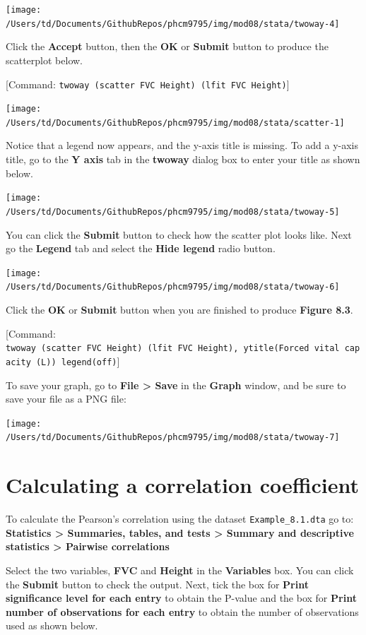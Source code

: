 \documentclass[
]{memoir}
\begin{document}
\texttt{[image: /Users/td/Documents/GithubRepos/phcm9795/img/mod08/stata/twoway-4]}

Click the \textbf{Accept} button, then the \textbf{OK} or \textbf{Submit} button to produce the scatterplot below.

{[}Command: \texttt{twoway\ (scatter\ FVC\ Height)\ (lfit\ FVC\ Height)}{]}

\texttt{[image: /Users/td/Documents/GithubRepos/phcm9795/img/mod08/stata/scatter-1]}

Notice that a legend now appears, and the y-axis title is missing. To add a y-axis title, go to the \textbf{Y axis} tab in the \textbf{twoway} dialog box to enter your title as shown below.

\texttt{[image: /Users/td/Documents/GithubRepos/phcm9795/img/mod08/stata/twoway-5]}

You can click the \textbf{Submit} button to check how the scatter plot looks like. Next go the \textbf{Legend} tab and select the \textbf{Hide legend} radio button.

\texttt{[image: /Users/td/Documents/GithubRepos/phcm9795/img/mod08/stata/twoway-6]}

Click the \textbf{OK} or \textbf{Submit} button when you are finished to produce \textbf{Figure 8.3}.

{[}Command: \texttt{twoway\ (scatter\ FVC\ Height)\ (lfit\ FVC\ Height),\ ytitle(Forced\ vital\ capacity\ (L))\ legend(off)}{]}

To save your graph, go to \textbf{File \textgreater{} Save} in the \textbf{Graph} window, and be sure to save your file as a PNG file:

\texttt{[image: /Users/td/Documents/GithubRepos/phcm9795/img/mod08/stata/twoway-7]}

\hypertarget{calculating-a-correlation-coefficient}{%
\section{Calculating a correlation coefficient}\label{calculating-a-correlation-coefficient}}

To calculate the Pearson's correlation using the dataset \texttt{Example\_8.1.dta} go to: \textbf{Statistics \textgreater{} Summaries, tables, and tests \textgreater{} Summary and descriptive statistics \textgreater{} Pairwise correlations}

Select the two variables, \textbf{FVC} and \textbf{Height} in the \textbf{Variables} box. You can click the \textbf{Submit} button to check the output. Next, tick the box for \textbf{Print significance level for each entry} to obtain the P-value and the box for \textbf{Print number of observations for each entry} to obtain the number of observations used as shown below.
\end{document}
